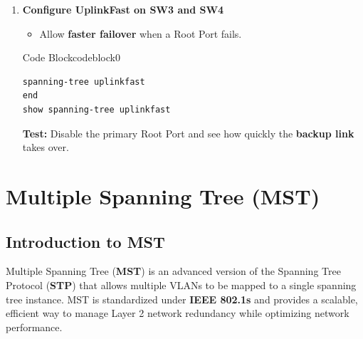 \documentclass[a4paper]{book}
\begin{document}
\begin{enumerate}


	      \begin{ocg}{Code Block}{codeblock}{0}
		      \vspace{0.5cm}
		      \begin{lstlisting}
spanning-tree vlan 1 forward-time 10
spanning-tree vlan 1 max-age 15
end
show spanning-tree detail
              \end{lstlisting}
	      \end{ocg}



	\item \textbf{Configure UplinkFast on SW3 and SW4}
	      \begin{itemize}
		      \item Allow \textbf{faster failover} when a Root Port fails.
	      \end{itemize}



	      \begin{ocg}{Code Block}{codeblock}{0}
		      \vspace{0.5cm}
		      \begin{lstlisting}
spanning-tree uplinkfast
end
show spanning-tree uplinkfast
    \end{lstlisting}
	      \end{ocg}


	      \textbf{Test:} Disable the primary Root Port and see how quickly the \textbf{backup link} takes over.

\end{enumerate}


\chapter{Multiple Spanning Tree (MST)}


\section*{Introduction to MST}
Multiple Spanning Tree (\textbf{MST}) is an advanced version of the Spanning Tree Protocol (\textbf{STP}) that allows multiple VLANs to be mapped to a single spanning tree instance. MST is standardized under \textbf{IEEE 802.1s} and provides a scalable, efficient way to manage Layer 2 network redundancy while optimizing network performance.
\end{document}
